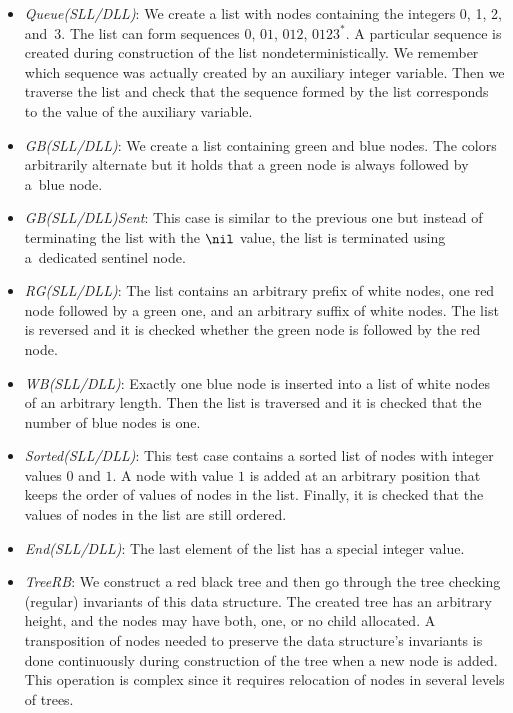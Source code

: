{\begin{itemize}
    its address is assigned to the optional pointer. We verify the relation of
    integer values and optional pointers for all nodes of the list.
  \item \emph{Queue(SLL/DLL)}: We create a list with nodes containing the integers 0, 1, 2, and~3.
    The list can form sequences $0$, $01$, $012$, $0123^*$. A particular sequence is created
    during construction of the list nondeterministically. We remember which sequence was actually created
    by an auxiliary integer variable. Then we traverse the list and check that
    the sequence formed by the list corresponds to the value of the auxiliary variable.
  \item \emph{GB(SLL/DLL)}: We create a list containing green and blue nodes. The colors
    arbitrarily alternate but it holds that a green node is always followed by a~blue node.
  \item \emph{GB(SLL/DLL)Sent}: This case is similar to the previous one but instead of
    terminating the list with the $\nil$ value, the list is terminated using a~dedicated sentinel node.
  \item \emph{RG(SLL/DLL)}: The list contains an arbitrary prefix of white nodes,
    one red node followed by a green one, and an arbitrary suffix of white nodes.
    The list is reversed and it is checked whether the green node is followed by the red node.
  \item \emph{WB(SLL/DLL)}: Exactly one blue node is inserted into a list of white nodes
    of an arbitrary length. Then the list is traversed and it is checked that the number of blue
    nodes is one.
  \item \emph{Sorted(SLL/DLL)}: This test case contains a sorted list of nodes with integer values $0$ and $1$.
    A node with value $1$ is added at an arbitrary position that keeps the order of values of nodes in the list.
    Finally, it is checked that the values of nodes in the list are still ordered.
  \item \emph{End(SLL/DLL)}: The last element of the list has a special integer value.
  \item \emph{TreeRB}: We construct a red black tree and then go through the tree
    checking (regular) invariants of this data structure. The created tree has an arbitrary height,
    and the nodes may have both, one, or no child allocated. A transposition of nodes needed to
    preserve the data structure's invariants is done continuously during construction of the tree when a new node is added.
    This operation is complex since it requires relocation of nodes in several levels of trees.

\end{itemize}}
